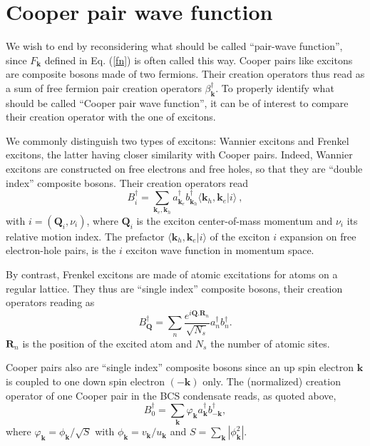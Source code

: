 \documentclass[twocolumn,showpacs]{revtex4}
\def\v#1{\mathbf{#1}}
\begin{document}
\section{Cooper pair wave function}

We wish to end by reconsidering what should be called ``pair-wave function'', since $F_{\v{k}}$ defined in Eq. (\ref{fn}) is often called this way.
Cooper pairs like excitons are composite bosons made of two fermions. Their creation operators thus read as a sum of free fermion pair creation operators $\beta_{\v k}^\dag$. To properly identify what should be called ``Cooper pair wave function'', it can be of interest to compare their creation operator with the one of excitons.

We commonly distinguish two types of excitons: Wannier excitons and Frenkel excitons, the latter having closer similarity with Cooper pairs. Indeed, Wannier excitons are constructed on free electrons and free holes, so that they are ``double index'' composite bosons. Their creation operators read
\begin{equation}
B_i^\dag=\sum_{\v k_e,\v k_h}a_{\v k_e}^\dag b_{\v k_h}^\dag \langle\v k_h,\v k_e|i\rangle\ ,
\end{equation}
with $i=(\v Q_i,\nu_i)$, where $\v Q_i$ is the exciton center-of-mass momentum and $\nu_i$ its relative motion index. The prefactor $\langle\v k_h,\v k_e|i\rangle$ of the exciton $i$ expansion on free electron-hole pairs, is the $i$ exciton wave function in momentum space.

By contrast, Frenkel excitons are made of atomic excitations for atoms on a regular lattice. They thus are ``single index'' composite bosons, their creation operators reading as
\begin{equation}
B_{\v Q}^\dag=\sum_n\frac{e^{i\v Q.\v R_n}}{\sqrt{N_s}} a_n^\dag b_n^\dag.
\end{equation} 
$\v R_n$ is the position of the excited atom and $N_s$ the number of atomic sites.

Cooper pairs also are ``single index'' composite bosons since an up spin electron $\v k$ is coupled to one down spin electron $(-\v k)$ only. The (normalized) creation operator of one Cooper pair in the BCS condensate reads, as quoted above,
\begin{equation}
B_0^\dag=\sum_{\v k}\varphi_{\v k}a_{\v k}^\dag b_{-\v k}^\dag,
\end{equation}
where $\varphi_{\v k}=\phi_{\v k}/\sqrt{S}$ with $\phi_{\v k}=v_{\v k}/u_{\v k}$ and $S=\sum_{\v k}|\phi_{\v k}^2|$. 
\end{document}
